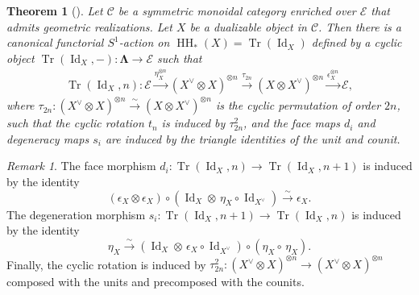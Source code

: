 \documentclass[11pt]{amsart}
\numberwithin{equation}{section}
\theoremstyle{plain}
\newtheorem{Thm}{Theorem}[section]
\theoremstyle{definition}
\theoremstyle{remark}
\newtheorem{RMK}[rmk]{Remark}
\newcommand{\cC} { {\mathcal{C}}}
\newcommand{\cE} { {\mathcal{E}}}
\newcommand{\Id}{{\operatorname{Id}}}
\newcommand\HH{\operatorname{HH}}
\newcommand\Tr{\operatorname{Tr}}
\begin{document}
\begin{Thm}[{\cite[Theorem 2.6]{Ayala-Francis-FH-dim1}}]\label{thm:AF}
    Let $\cC$ be a symmetric monoidal category enriched over $\cE$ that admits geometric realizations. Let $X$ be a dualizable object in $\cC$. Then there is a canonical functorial $S^1$-action on $\HH_*(X) = \Tr(\Id_X)$ defined by a cyclic object $\Tr(\Id_X, -) : \boldsymbol{\Lambda} \to \cE$ such that
    \begin{align*}
        \Tr(\Id_X, n): \cE \xrightarrow{\eta_X^{\otimes n}} (X^\vee \otimes X)^{\otimes n} \xrightarrow{\tau_{2n}} (X \otimes X^\vee)^{\otimes n} \xrightarrow{\epsilon_X^{\otimes n}} \cE,
    \end{align*}
    where $\tau_{2n}: (X^\vee \otimes X)^{\otimes n} \xrightarrow{\sim} (X \otimes X^\vee)^{\otimes n}$ is the cyclic permutation of order $2n$, such that the cyclic rotation $t_n$ is induced by $\tau_{2n}^2$, and the face maps $d_i$ and degeneracy maps $s_i$ are induced by the triangle identities of the unit and counit.
\end{Thm}
\begin{RMK}
    \label{rem:cyclic-object-map}
    The face morphism $d_i: \Tr(\Id_X, n) \to \Tr(\Id_X, n+1)$ is induced by the identity 
    \[(\epsilon_X \otimes \epsilon_X) \circ (\Id_X \otimes \,\eta_X \circ \Id_{X^\vee}) \xrightarrow{\sim} \epsilon_X.\]
    The degeneration morphism $s_i: \Tr(\Id_X, n+1) \to \Tr(\Id_X, n)$ is induced by the identity 
    \[\eta_X \xrightarrow{\sim} (\Id_X \otimes \,\epsilon_X \circ \Id_{X^\vee}) \circ (\eta_X \circ \,\eta_X).\]
    Finally, the cyclic rotation is induced by $\tau_{2n}^2: (X^\vee \otimes X)^{\otimes n} \to (X^\vee \otimes X)^{\otimes n}$ composed with the units and precomposed with the counits.
\end{RMK}
\end{document}

